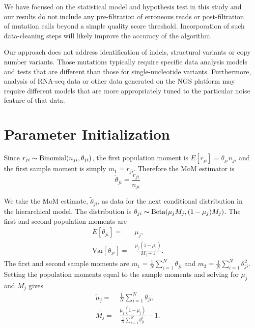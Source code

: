 \documentclass[11pt,reqno]{amsart}
\begin{document}
We have focused on the statistical model and hypothesis test in this study and our results do not include any pre-filtration of erroneous reads or post-filtration of mutation calls beyond a simple quality score threshold. Incorporation of such data-cleaning steps will likely improve the accuracy of the algorithm.

Our approach does not address identification of indels, structural variants or copy number variants. Those mutations typically require specific data analysis models and tests that are different than those for single-nucleotide variants. Furthermore, analysis of RNA-seq data or other data generated on the NGS platform may require different models that are more appropriately tuned to the particular noise feature of that data.

\appendix

\section{Parameter Initialization}\label{sec:appendix_mom}
Since $r_{ji} \thicksim \text{Binomial}(n_{ji}, \theta_{ji})$, the first population moment is  $E[r_{ji}] = \theta_{ji} n_{ji}$ and the first sample moment is simply $m_1 = r_{ji}$. Therefore the MoM estimator is 
\begin{equation}
	\tilde{\theta}_{ji} = \frac{r_{ji}} {n_{ji}}
\end{equation}

We take the MoM estimate, $\tilde{\theta}_{ji}$, as data for the next conditional distribution in the hierarchical model. The distribution is $\theta_{ji} \thicksim \text{Beta}(\mu_jM_j, (1-\mu_j)M_j)$. The first and second population moments are
\begin{eqnarray}
	E[\theta_{ji}] =& \mu_j,\\
	\text{Var}[\theta_{ji}] =& \frac{\mu_j(1-\mu_j)} { M_j + 1 }.
\end{eqnarray}
The first and second sample moments are $m_1 = \frac{1}{N}\sum_{i=1}^N \theta_{ji}$ and $m_2 = \frac{1}{N}\sum_{i=1}^N \theta_{ji}^2$. Setting the population moments equal to the sample moments and solving for $\mu_j$ and $M_j$ gives
\begin{eqnarray}
	\tilde{\mu}_j =& \frac{1}{N} \sum_{i=1}^N \theta_{ji}, \\
	\tilde{M_j} =& \frac{ \tilde{\mu}_j (1 - \tilde{\mu}_j ) } { \frac{1}{N} \sum_{i=1}^N \theta_{ji}^2 } -1.
\end{eqnarray}
\end{document}
